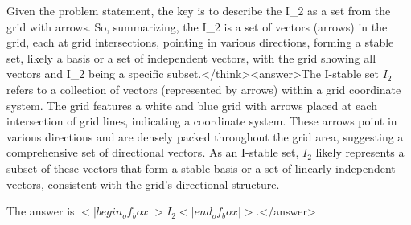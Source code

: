 Given the problem statement, the key is to describe the I_2 as a set from the grid with arrows. So, summarizing, the I_2 is a set of vectors (arrows) in the grid, each at grid intersections, pointing in various directions, forming a stable set, likely a basis or a set of independent vectors, with the grid showing all vectors and I_2 being a specific subset.</think><answer>The I-stable set \( I_2 \) refers to a collection of vectors (represented by arrows) within a grid coordinate system. The grid features a white and blue grid with arrows placed at each intersection of grid lines, indicating a coordinate system. These arrows point in various directions and are densely packed throughout the grid area, suggesting a comprehensive set of directional vectors. As an I-stable set, \( I_2 \) likely represents a subset of these vectors that form a stable basis or a set of linearly independent vectors, consistent with the grid's directional structure.  

The answer is \(<|begin_of_box|>I_2<|end_of_box|>\).</answer>